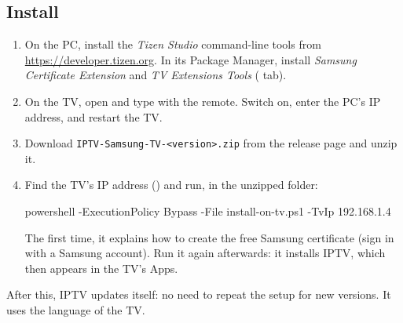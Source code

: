 \subsection{Install}
\begin{enumerate}
  \item On the PC, install the \emph{Tizen Studio} command-line tools from
        \url{https://developer.tizen.org}. In its Package Manager, install
        \emph{Samsung Certificate Extension} and \emph{TV Extensions Tools}
        ( tab).
  \item On the TV, open  and type 
        with the remote. Switch  on, enter the PC's IP
        address, and restart the TV.
  \item Download \texttt{IPTV-Samsung-TV-\textless version\textgreater.zip}
        from the release page and unzip it.
  \item Find the TV's IP address () and run,
        in the unzipped folder:
\begin{center}
\begin{minipage}{0.92\linewidth}
\small\ttfamily powershell -ExecutionPolicy Bypass -File install-on-tv.ps1 -TvIp 192.168.1.4
\end{minipage}
\end{center}
        The first time, it explains how to create the free Samsung certificate
        (sign in with a Samsung account). Run it again afterwards: it installs
        IPTV, which then appears in the TV's Apps.
\end{enumerate}
After this, IPTV updates itself: no need to repeat the setup for new
versions. It uses the language of the TV.

